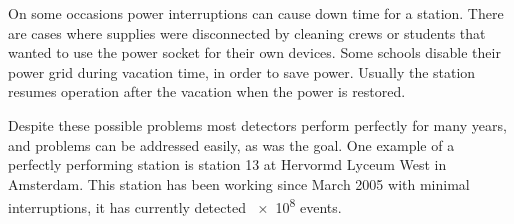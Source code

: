 On some occasions power interruptions can cause down time for a station.  There are cases where supplies were disconnected by cleaning crews or students that wanted to use the power socket for their own devices. Some schools disable their power grid during vacation time, in order to save power. Usually the station resumes operation after the vacation when the power is restored.

Despite these possible problems most detectors perform perfectly for many years, and problems can be addressed easily, as was the goal. One example of a perfectly performing station is station 13 at Hervormd Lyceum West in Amsterdam. This station has been working since March 2005 with minimal interruptions, it has currently detected \num{e8} events.
